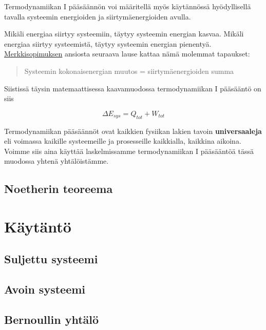 \documentclass[12pt,a4paper,finnish]{book}
\begin{document}
Termodynamiikan I pääsäännön voi määritellä myös käytännössä hyödyllisellä tavalla 
systeemin energioiden ja siirtymäenergioiden avulla. 

Mikäli energiaa siirtyy systeemiin, 
täytyy systeemin energian kasvaa. Mikäli energiaa siirtyy systeemistä, täytyy systeemin 
energian pienentyä. \hyperref[sec:merkkisopimus]{Merkkisopimuksen} ansiosta seuraava 
lause kattaa nämä molemmat tapaukset:

\begin{quote}
 Systeemin kokonaisenergian muutos = siirtymäenergioiden summa
\end{quote}

Siistissä täysin matemaattisessa kaavamuodossa termodynamiikan I pääsääntö on siis

\begin{equation}
 \Delta E_{sys} = Q_{tot} + W_{tot}
\end{equation}

Termodynamiikan pääsäännöt ovat kaikkien fysiikan lakien tavoin \textbf{universaaleja} 
eli voimassa kaikille systeemeille ja prosesseille kaikkialla, kaikkina aikoina. Voimme 
siis aina käyttää laskelmissamme termodynamiikan I pääsääntöä tässä muodossa yhtenä 
yhtälöistämme.

\subsection{Noetherin teoreema}

\section{Käytäntö} %

\subsection{Suljettu systeemi}

\subsection{Avoin systeemi}

\subsection{Bernoullin yhtälö}

\end{document}
